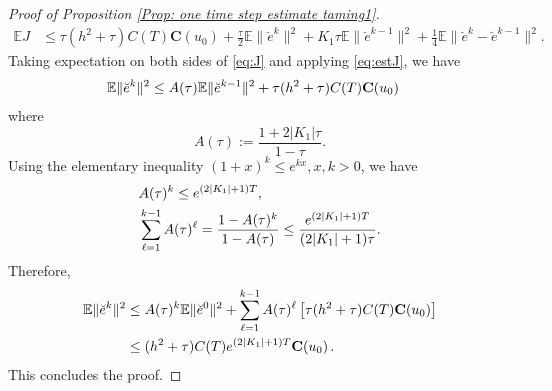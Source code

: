 \documentclass[reqno, 11pt]{amsart}
\theoremstyle{plain}
\theoremstyle{definition}
\theoremstyle{remark}
\numberwithin{equation}{section}
\numberwithin{theorem}{section}
\newcommand{\con}{\mathbf{C}}
\begin{document}
{\begin{proof}[Proof of Proposition \ref{Prop: one time  step estimate taming1}]
\begin{align}
\mathbb{E} J &\leq \tau (h^2+\tau)C(T) \con(u_0)+ \frac{\tau}{2} \mathbb{E}\|\breve{e}^k\|^2+ K_1\tau \mathbb{E}\|\breve{e}^{k-1}\|^2+\frac{1}{4} \mathbb{E}\|\breve{e}^k-\breve{e}^{k-1}\|^2 .
\end{align}
Taking expectation on both sides of \eqref{eq:J} and applying \eqref{eq:estJ}, we have
\begin{align}\label{eq:hate1}
\mathbb{E}&\|\breve{e}^k\|^2\leq A(\tau)\mathbb{E}\|\breve{e}^{k-1}\|^2+\tau (h^2+\tau)C(T) \con(u_0)\notag
\end{align}
where
$$
A(\tau):=\frac{1+2 |K_1|\tau}{1-\tau}.
$$
Using the elementary inequality $(1+x)^k\leq e^{kx}, x,k>0$, we have
\begin{align}
& A(\tau)^k\leq e^{(2|K_1|+1)T}, \notag\\
&\sum\limits_{\ell=1}^{k-1}A(\tau)^\ell=\frac{1-A(\tau)^k}{1-A(\tau)}\leq \frac{e^{(2|K_1|+1)T}}{(2|K_1|+1)\tau}.
\end{align}
Therefore,
\begin{align}\label{eq:hate2}
\mathbb{E}\|\breve{e}^k\|^2 &\leq A(\tau)^k\mathbb{E}\|\breve{e}^0\|^2+\sum\limits_{\ell=1}^{k-1} A(\tau)^\ell\left[\tau (h^2+\tau)C(T) \con(u_0)\right]\notag \\
&\leq (h^2+\tau)C(T) e^{(2|K_1|+1)T} \con(u_0) \,.\notag
\end{align}
This concludes the proof. 
\end{proof}

}
\end{document}

